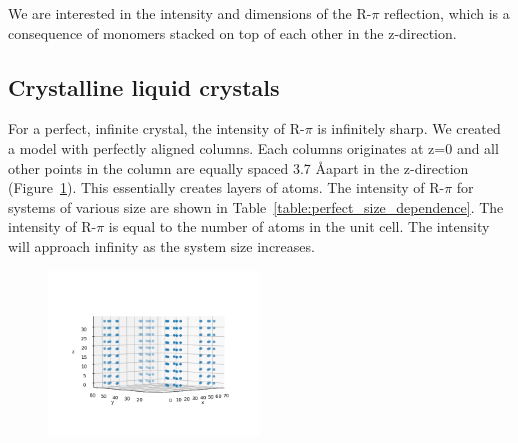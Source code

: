 \documentclass{article}
\begin{document}
  We are interested in the intensity and dimensions of the R-$\pi$ reflection,
  which is a consequence of monomers stacked on top of each other in the
  z-direction.

  \subsection{Crystalline liquid crystals}

  For a perfect, infinite crystal, the intensity of R-$\pi$ is infinitely sharp. We
  created a model with perfectly aligned columns. Each columns originates at z=0
  and all other points in the column are equally spaced 3.7 \AA apart in the
  z-direction (Figure~\ref{fig:perfect_crystal_xyz}). This essentially creates
  layers of atoms. The intensity of R-$\pi$ for systems of various size are shown
  in Table~\ref{table:perfect_size_dependence}. The intensity of R-$\pi$ is equal
  to the number of atoms in the unit cell. The intensity will approach infinity as
  the system size increases.  

  \begin{figure}[!htb]
  \centering
  \includegraphics[width=0.5\textwidth]{perfect_crystal_xyz.png}
  \caption{}\label{fig:perfect_crystal_xyz}
  \end{figure}
\end{document}
